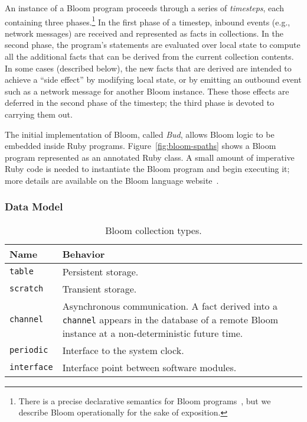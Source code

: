 An instance of a Bloom program proceeds through a series of \emph{timesteps},
each containing three phases.\footnote{There is a precise declarative semantics
  for Bloom programs~\cite{dedalus}, but we describe Bloom operationally for the
  sake of exposition.} In the first phase of a timestep, inbound events (e.g.,
network messages) are received and represented as facts in collections. In the
second phase, the program's statements are evaluated over local state to compute
all the additional facts that can be derived from the current collection
contents. In some cases (described below), the new facts that are derived are
intended to achieve a ``side effect'' by modifying local state, or by emitting
an outbound event such as a network message for another Bloom instance.  These
those effects are deferred in the second phase of the timestep; the third phase
is devoted to carrying them out.

The initial implementation of Bloom, called \emph{Bud}, allows Bloom logic to
be embedded inside Ruby programs. Figure~\ref{fig:bloom-spaths} shows a Bloom program represented as an annotated Ruby class. A small amount of imperative Ruby code is needed to
instantiate the Bloom program and begin executing it; more details are available
on the Bloom language website~\cite{bloom}.

\subsubsection{Data Model}
\begin{table}[t]
\begin{tabular}{|l|p{2.32in}|}
\hline
\textbf{Name} & \textbf{Behavior }\\
\hline
\texttt{table} & Persistent storage.\\
\texttt{scratch} & Transient storage.\\
\texttt{channel} & Asynchronous communication. A fact derived into a \texttt{channel} appears in the
database of a remote Bloom instance at a non-deterministic future time.\\
\texttt{periodic} & Interface to the system clock.\\
\texttt{interface} & Interface point between software modules.\\
\hline
\end{tabular}
\caption{Bloom collection types.}
\label{tbl:bloom-collections}
\end{table}

